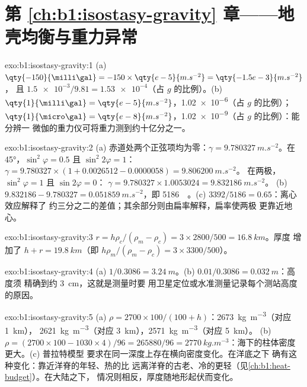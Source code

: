 \section*{第 \ref{ch:b1:isostasy-gravity} 章——地壳均衡与重力异常}

\begin{solution}{exo:b1:isostasy-gravity:1}
(a) $\qty{-150}{\milli\gal} = -150\times\qty{e-5}{m.s^{-2}} = \qty{-1.5e-3}{m.s^{-2}}$，
且 $\num{1.5e-3}/9.81 = \num{1.53e-4}$（占 $g$ 的比例）。(b) $\qty{1}{\milli\gal} =
\qty{e-5}{m.s^{-2}}$，\num{1.02e-6}（占 $g$ 的比例）；$\qty{1}{\micro\gal} =
\qty{e-8}{m.s^{-2}}$，\num{1.02e-9}（占 $g$ 的比例）：能分辨一
微伽的重力仪可将重力测到约十亿分之一。
\end{solution}

\begin{solution}{exo:b1:isostasy-gravity:2}
(a) 赤道处两个正弦项均为零：$\gamma = \qty{9.780327}{m.s^{-2}}$。在
\ang{45}，$\sin^2\varphi = 0.5$ 且 $\sin^2 2\varphi = 1$：
$\gamma = 9.780327\times(1 + 0.0026512 - 0.0000058) = \qty{9.806200}{m.s^{-2}}$。
在两极，$\sin^2\varphi = 1$ 且 $\sin 2\varphi = 0$：
$\gamma = 9.780327\times1.0053024 = \qty{9.832186}{m.s^{-2}}$。
(b) $9.832186 - 9.780327 = \qty{0.051859}{m.s^{-2}}$，即
\qty{5186}{\milli\gal}。(c) $3392/5186 = 0.65$：离心效应解释了
约三分之二的差值；其余部分则由扁率解释，扁率使两极
更靠近地心。
\end{solution}

\begin{solution}{exo:b1:isostasy-gravity:3}
$r = h\rho_c/(\rho_m - \rho_c) = 3\times2800/500 = \qty{16.8}{km}$。厚度
增加了 $h + r = \qty{19.8}{km}$（即 $h\rho_m/(\rho_m - \rho_c) =
3\times3300/500$）。
\end{solution}

\begin{solution}{exo:b1:isostasy-gravity:4}
(a) $1/0.3086 = \qty{3.24}{m}$。(b) $0.01/0.3086 = \qty{0.032}{m}$：高度须
精确到约 \qty{3}{cm}，这就是测量时要
用卫星定位或水准测量记录每个测站高度的原因。
\end{solution}

\begin{solution}{exo:b1:isostasy-gravity:5}
(a) $\rho = 2700\times100/(100 + h)$：\qty{2673}{kg.m^{-3}}（对应 \qty{1}{km}），
\qty{2621}{kg.m^{-3}}（对应 \qty{3}{km}），\qty{2571}{kg.m^{-3}}（对应 \qty{5}{km}）。
(b) $\rho = (2700\times100 - 1030\times4)/96 = \num{265880}/96 =
\qty{2770}{kg.m^{-3}}$：海下的柱体密度更大。(c) 普拉特模型
要求在同一深度上存在横向密度变化。在洋底之下
确有这种变化：靠近洋脊的年轻、热的比
远离洋脊的古老、冷的更轻（见\cref{ch:b1:heat-budget}）。在大陆之下，
情况则相反，厚度随地形起伏而变化。
\end{solution}

